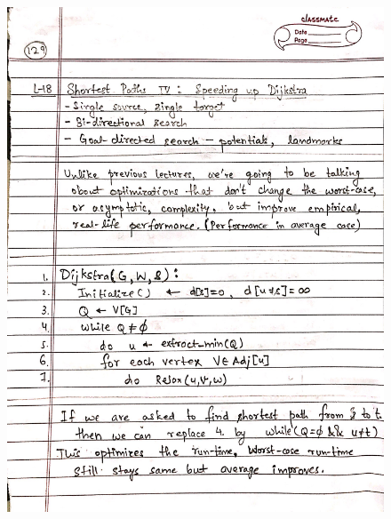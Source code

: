 \begin{figure}[H]
    \centering
    \includegraphics[width=16cm, height=21cm]{"./MIT-6.006/MIT-6006-129"}
\end{figure}
\newpage
